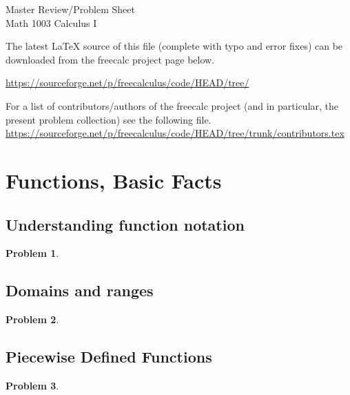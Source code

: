 \documentclass{article}
\newtheorem{problem}{Problem}
\begin{document}
\begin{center}
\Large
Master Review/Problem Sheet \\ Math 1003 Calculus I \\ 
\end{center}





The latest \LaTeX{} source of this file (complete with typo and error fixes) can be downloaded from the freecalc project page below. 

\url{https://sourceforge.net/p/freecalculus/code/HEAD/tree/}

For a list of contributors/authors of the freecalc project (and in particular, the present problem collection) see the following file.
\url{https://sourceforge.net/p/freecalculus/code/HEAD/tree/trunk/contributors.tex}


\fcLicenseContent



\tableofcontents

\section{Functions, Basic Facts}\label{secMPSfunctionBasics}
\subsection{Understanding function notation}
\begin{problem}

\end{problem}
\subsection{Domains and ranges}
\begin{problem}

\end{problem}
\subsection{Piecewise Defined Functions}
\begin{problem}
\item 
\end{problem}
\end{document}
